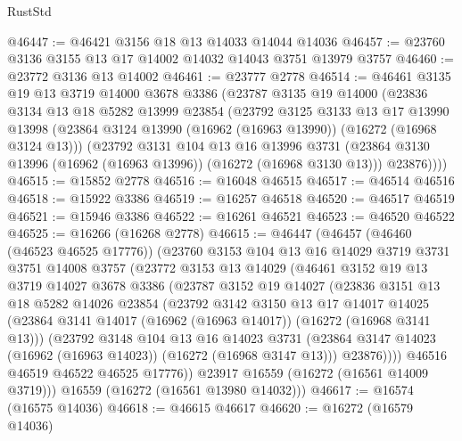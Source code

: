 \begin{lexlean}{RustStd}
\begin{coremodule}
@46447 := @46421 @3156 @18 @13 @14033 @14044 @14036
@46457 := @23760 @3136 @3155 @13 @17 @14002 @14032 @14043 @3751 @13979 @3757
@46460 := @23772 @3136 @13 @14002
@46461 := @23777 @2778
@46514 := @46461
    @3135
    @19
    @13
    @3719
    @14000
    @3678
    @3386
    (@23787
      @3135
      @19
      @14000
      (@23836
        @3134
        @13
        @18
        @5282
        @13999
        @23854
        (@23792
          @3125
          @3133
          @13
          @17
          @13990
          @13998
          (@23864 @3124 @13990 (@16962 (@16963 @13990)) (@16272 (@16968 @3124 @13)))
          (@23792
            @3131
            @104
            @13
            @16
            @13996
            @3731
            (@23864 @3130 @13996 (@16962 (@16963 @13996)) (@16272 (@16968 @3130 @13)))
            @23876))))
@46515 := @15852 @2778
@46516 := @16048 @46515
@46517 := @46514 @46516
@46518 := @15922 @3386
@46519 := @16257 @46518
@46520 := @46517 @46519
@46521 := @15946 @3386
@46522 := @16261 @46521
@46523 := @46520 @46522
@46525 := @16266 (@16268 @2778)
@46615 := @46447
    (@46457
      (@46460 (@46523 @46525 @17776))
      (@23760
        @3153
        @104
        @13
        @16
        @14029
        @3719
        @3731
        @3751
        @14008
        @3757
        (@23772
          @3153
          @13
          @14029
          (@46461
            @3152
            @19
            @13
            @3719
            @14027
            @3678
            @3386
            (@23787
              @3152
              @19
              @14027
              (@23836
                @3151
                @13
                @18
                @5282
                @14026
                @23854
                (@23792
                  @3142
                  @3150
                  @13
                  @17
                  @14017
                  @14025
                  (@23864 @3141 @14017 (@16962 (@16963 @14017)) (@16272 (@16968 @3141 @13)))
                  (@23792
                    @3148
                    @104
                    @13
                    @16
                    @14023
                    @3731
                    (@23864 @3147 @14023 (@16962 (@16963 @14023)) (@16272 (@16968 @3147 @13)))
                    @23876))))
            @46516
            @46519
            @46522
            @46525
            @17776))
        @23917
        @16559
        (@16272 (@16561 @14009 @3719)))
      @16559
      (@16272 (@16561 @13980 @14032)))
@46617 := @16574 (@16575 @14036)
@46618 := @46615 @46617
@46620 := @16272 (@16579 @14036)

\end{coremodule}
\end{lexlean}

